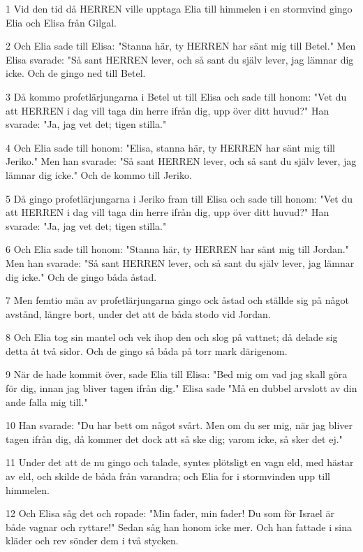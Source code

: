 \par 1 Vid den tid då HERREN ville upptaga Elia till himmelen i en stormvind gingo Elia och Elisa från Gilgal.
\par 2 Och Elia sade till Elisa: "Stanna här, ty HERREN har sänt mig till Betel." Men Elisa svarade: "Så sant HERREN lever, och så sant du själv lever, jag lämnar dig icke. Och de gingo ned till Betel.
\par 3 Då kommo profetlärjungarna i Betel ut till Elisa och sade till honom: "Vet du att HERREN i dag vill taga din herre ifrån dig, upp över ditt huvud?" Han svarade: "Ja, jag vet det; tigen stilla."
\par 4 Och Elia sade till honom: "Elisa, stanna här, ty HERREN har sänt mig till Jeriko." Men han svarade: "Så sant HERREN lever, och så sant du själv lever, jag lämnar dig icke." Och de kommo till Jeriko.
\par 5 Då gingo profetlärjungarna i Jeriko fram till Elisa och sade till honom: "Vet du att HERREN i dag vill taga din herre ifrån dig, upp över ditt huvud?" Han svarade: "Ja, jag vet det; tigen stilla."
\par 6 Och Elia sade till honom: "Stanna här, ty HERREN har sänt mig till Jordan." Men han svarade: "Så sant HERREN lever, och så sant du själv lever, jag lämnar dig icke." Och de gingo båda åstad.
\par 7 Men femtio män av profetlärjungarna gingo ock åstad och ställde sig på något avstånd, längre bort, under det att de båda stodo vid Jordan.
\par 8 Och Elia tog sin mantel och vek ihop den och slog på vattnet; då delade sig detta åt två sidor. Och de gingo så båda på torr mark därigenom.
\par 9 När de hade kommit över, sade Elia till Elisa: "Bed mig om vad jag skall göra för dig, innan jag bliver tagen ifrån dig." Elisa sade "Må en dubbel arvslott av din ande falla mig till."
\par 10 Han svarade: "Du har bett om något svårt. Men om du ser mig, när jag bliver tagen ifrån dig, då kommer det dock att så ske dig; varom icke, så sker det ej."
\par 11 Under det att de nu gingo och talade, syntes plötsligt en vagn eld, med hästar av eld, och skilde de båda från varandra; och Elia for i stormvinden upp till himmelen.
\par 12 Och Elisa såg det och ropade: "Min fader, min fader! Du som för Israel är både vagnar och ryttare!" Sedan såg han honom icke mer. Och han fattade i sina kläder och rev sönder dem i två stycken.
